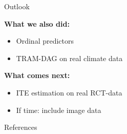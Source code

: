 \documentclass[onlytextwidth,english]{beamer}\usepackage[]{graphicx}\usepackage[]{xcolor}
\begin{document}
% 
% 
% 
% 
% 


\begin{frame}{Outlook}


\textbf{What we also did:}

\begin{itemize}
    \item Ordinal predictors
    \item TRAM-DAG on real climate data
\end{itemize}

\vspace{0.4cm}

\textbf{What comes next:}
\begin{itemize}
    \item ITE estimation on real RCT-data
    \item If time: include image data
\end{itemize}


\end{frame}




\begin{frame}{References}
  \small
  

\end{frame}
\end{document}

